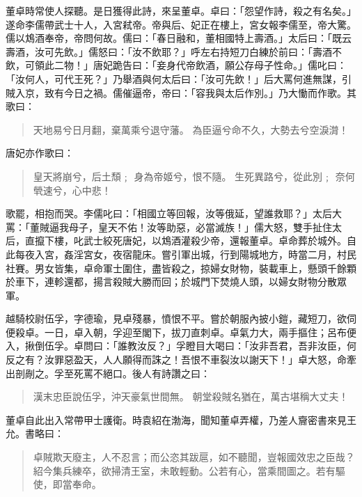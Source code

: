 董卓時常使人探聽。是日獲得此詩，來呈董卓。卓曰：「怨望作詩，殺之有名矣。」遂命李儒帶武士十人，入宮弒帝。帝與后、妃正在樓上，宮女報李儒至，帝大驚。儒以鴆酒奉帝，帝問何故。儒曰：「春日融和，董相國特上壽酒。」太后曰：「既云壽酒，汝可先飲。」儒怒曰：「汝不飲耶？」呼左右持短刀白練於前曰：「壽酒不飲，可領此二物！」唐妃跪告曰：「妾身代帝飲酒，願公存母子性命。」儒叱曰：「汝何人，可代王死？」乃舉酒與何太后曰：「汝可先飲！」后大罵何進無謀，引賊入京，致有今日之禍。儒催逼帝，帝曰：「容我與太后作別。」乃大慟而作歌。其歌曰：

\begin{quote}
天地易兮日月翻，棄萬乘兮退守藩。
為臣逼兮命不久，大勢去兮空淚潸！
\end{quote}

唐妃亦作歌曰：

\begin{quote}
皇天將崩兮，后土頹﹔
身為帝姬兮，恨不隨。
生死異路兮，從此別﹔
奈何煢速兮，心中悲！
\end{quote}

歌罷，相抱而哭。李儒叱曰：「相國立等回報，汝等俄延，望誰救耶？」太后大罵：「董賊逼我母子，皇天不佑！汝等助惡，必當滅族！」儒大怒，雙手扯住太后，直攛下樓，叱武士絞死唐妃，以鴆酒灌殺少帝，還報董卓。卓命葬於城外。自此每夜入宮，姦淫宮女，夜宿龍床。嘗引軍出城，行到陽城地方，時當二月，村民社賽。男女皆集，卓命軍士圍住，盡皆殺之，掠婦女財物，裝載車上，懸頭千餘顆於車下，連軫還都，揚言殺賊大勝而回；於城門下焚燒人頭，以婦女財物分散眾軍。

越騎校尉伍孚，字德瑜，見卓殘暴，憤恨不平。嘗於朝服內披小鎧，藏短刀，欲伺便殺卓。一日，卓入朝，孚迎至閣下，拔刀直刺卓。卓氣力大，兩手摳住；呂布便入，揪倒伍孚。卓問曰：「誰教汝反？」孚瞪目大喝曰：「汝非吾君，吾非汝臣，何反之有？汝罪惡盈天，人人願得而誅之！吾恨不車裂汝以謝天下！」卓大怒，命牽出剖剮之。孚至死罵不絕口。後人有詩讚之曰：

\begin{quote}
漢末忠臣說伍孚，沖天豪氣世間無。
朝堂殺賊名猶在，萬古堪稱大丈夫！
\end{quote}

董卓自此出入常帶甲士護衛。時袁紹在渤海，聞知董卓弄權，乃差人齎密書來見王允。書略曰：

\begin{quote}
卓賊欺天廢主，人不忍言；而公恣其跋扈，如不聽聞，豈報國效忠之臣哉？紹今集兵練卒，欲掃清王室，未敢輕動。公若有心，當乘間圖之。若有驅使，即當奉命。
\end{quote}

